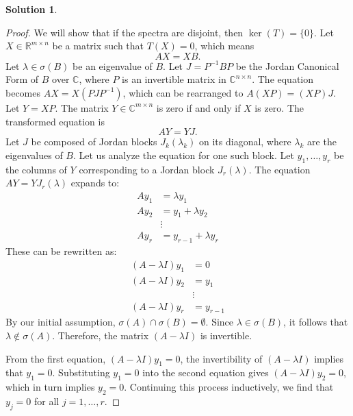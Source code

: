 \documentclass[12pt]{article}
\theoremstyle{definition}
\newtheorem*{solution}{\normalfont\textbf{Solution}}
\begin{document}
\begin{enumerate}[leftmargin=*]
\begin{solution}
\begin{proof}
                We will show that if the spectra are disjoint, then \( \ker(T) = \{0\} \). Let \( X \in \mathbb{R}^{m \times n} \) be a matrix such that \( T(X) = 0 \), which means
                \[
                AX = XB.
                \]
                Let \( \lambda \in \sigma(B) \) be an eigenvalue of \( B \). Let \( J = P^{-1}BP \) be the Jordan Canonical Form of \( B \) over \( \mathbb{C} \), where \( P \) is an invertible matrix in \( \mathbb{C}^{n \times n} \). The equation becomes \( AX = X(PJP^{-1}) \), which can be rearranged to \( A(XP) = (XP)J \). Let \( Y = XP \). The matrix \( Y \in \mathbb{C}^{m \times n} \) is zero if and only if \( X \) is zero. The transformed equation is
                \[
                AY = YJ.
                \]
                Let \( J \) be composed of Jordan blocks \( J_k(\lambda_k) \) on its diagonal, where \( \lambda_k \) are the eigenvalues of \( B \). Let us analyze the equation for one such block. Let \( y_1, \dots, y_r \) be the columns of \( Y \) corresponding to a Jordan block \( J_r(\lambda) \). The equation \( AY = YJ_r(\lambda) \) expands to:
                \begin{align*}
                Ay_1 &= \lambda y_1 \\
                Ay_2 &= y_1 + \lambda y_2 \\
                & \vdots \\
                Ay_r &= y_{r-1} + \lambda y_r
                \end{align*}
                These can be rewritten as:
                \begin{align*}
                (A - \lambda I)y_1 &= 0 \\
                (A - \lambda I)y_2 &= y_1 \\
                & \vdots \\
                (A - \lambda I)y_r &= y_{r-1}
                \end{align*}
                By our initial assumption, \( \sigma(A) \cap \sigma(B) = \emptyset \). Since \( \lambda \in \sigma(B) \), it follows that \( \lambda \notin \sigma(A) \). Therefore, the matrix \( (A - \lambda I) \) is invertible.

                From the first equation, \( (A - \lambda I)y_1 = 0 \), the invertibility of \( (A - \lambda I) \) implies that \( y_1 = 0 \).
                Substituting \( y_1 = 0 \) into the second equation gives \( (A - \lambda I)y_2 = 0 \), which in turn implies \( y_2 = 0 \).
                Continuing this process inductively, we find that \( y_j = 0 \) for all \( j = 1, \dots, r \).


\end{proof}
\end{solution}
\end{enumerate}
\end{document}
